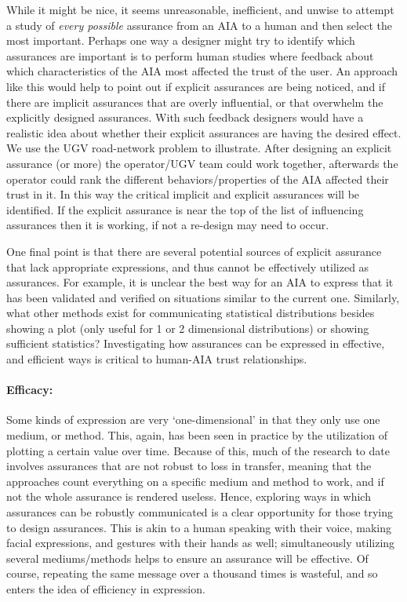    While it might be nice, it seems unreasonable, inefficient, and unwise to attempt a study of \emph{every possible} assurance from an AIA to a human and then select the most important. Perhaps one way a designer might try to identify which assurances are important is to perform human studies where feedback about which characteristics of the AIA most affected the trust of the user. An approach like this would help to point out if explicit assurances are being noticed, and if there are implicit assurances that are overly influential, or that overwhelm the explicitly designed assurances. With such feedback designers would have a realistic idea about whether their explicit assurances are having the desired effect. We use the UGV road-network problem to illustrate. After designing an explicit assurance (or more) the operator/UGV team could work together, afterwards the operator could rank the different behaviors/properties of the AIA affected their trust in it. In this way the critical implicit and explicit assurances will be identified. If the explicit assurance is near the top of the list of influencing assurances then it is working, if not a re-design may need to occur.

    One final point is that there are several potential sources of explicit assurance that lack appropriate expressions, and thus cannot be effectively utilized as assurances. For example, it is unclear the best way for an AIA to express that it has been validated and verified on situations similar to the current one. Similarly, what other methods exist for communicating statistical distributions besides showing a plot (only useful for 1 or 2 dimensional distributions) or showing sufficient statistics? Investigating how assurances can be expressed in effective, and efficient ways is critical to human-AIA trust relationships.

    \paragraph{Efficacy:} Some kinds of expression are very `one-dimensional' in that they only use one medium, or method. This, again, has been seen in practice by the utilization of plotting a certain value over time. Because of this, much of the research to date involves assurances that are not robust to loss in transfer, meaning that the approaches count everything on a specific medium and method to work, and if not the whole assurance is rendered useless. Hence, exploring ways in which assurances can be robustly communicated is a clear opportunity for those trying to design assurances. This is akin to a human speaking with their voice, making facial expressions, and gestures with their hands as well; simultaneously utilizing several mediums/methods helps to ensure an assurance will be effective. Of course, repeating the same message over a thousand times is wasteful, and so enters the idea of efficiency in expression.

